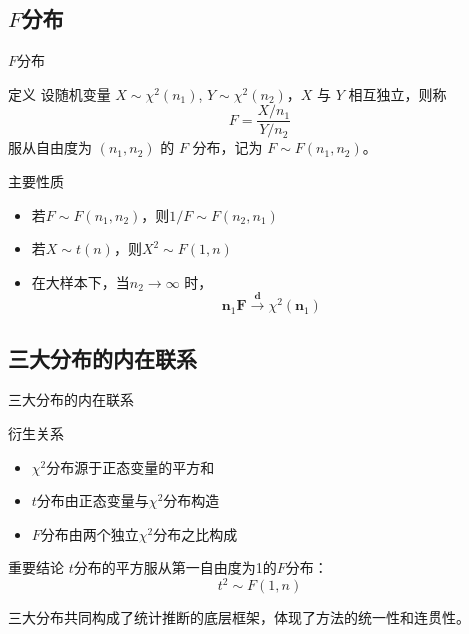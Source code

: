 \documentclass{beamer}
\newenvironment{block*}
  {\setbeamercolor{block title}{bg=white,fg=white}%
   \begin{block}{}}
  {\end{block}}
\begin{document}
\subsection{\(F\)分布}
\begin{frame}{\(F\)分布}
    \begin{block}{定义}
        设随机变量 \( X \sim \chi^2(n_1) \), \( Y \sim \chi^2(n_2) \)，\( X \) 与 \( Y \) 相互独立，则称
        \[F = \frac{X/n_1}{Y/n_2}\]
        服从自由度为 \((n_1, n_2)\) 的 \( F \) 分布，记为 \( F \sim F(n_1, n_2) \)。
    \end{block}

    \vspace{0.3cm}

    \begin{block}{主要性质}
        \begin{itemize}
            \item 若\(F \sim F(n_1, n_2)\)，则\(1/F \sim F(n_2, n_1)\)
            \item 若\(X \sim t(n)\)，则\(X^2 \sim F(1, n)\)
            \item 在大样本下，当\( n_2 \to \infty \) 时，\[\mathbf{n}_1 \mathbf{F} \xrightarrow{\mathbf{d}} \chi^2(\mathbf{n}_1)\]
        \end{itemize}
    \end{block}
\end{frame}

\subsection{三大分布的内在联系}
\begin{frame}{三大分布的内在联系}
    \begin{block}{衍生关系}
        \begin{itemize}
            \item \(\chi^2\)分布源于正态变量的平方和
            \item \(t\)分布由正态变量与\(\chi^2\)分布构造
            \item \(F\)分布由两个独立\(\chi^2\)分布之比构成
        \end{itemize}
    \end{block}

    \vspace{0.5cm}

    \begin{alertblock}{重要结论}
        \(t\)分布的平方服从第一自由度为1的\(F\)分布：
        \[t^2 \sim F(1, n)\]
    \end{alertblock}

    \vspace{0.5cm}

    \begin{block*}
        三大分布共同构成了统计推断的底层框架，体现了方法的统一性和连贯性。
    \end{block*}
\end{frame}
\end{document}
